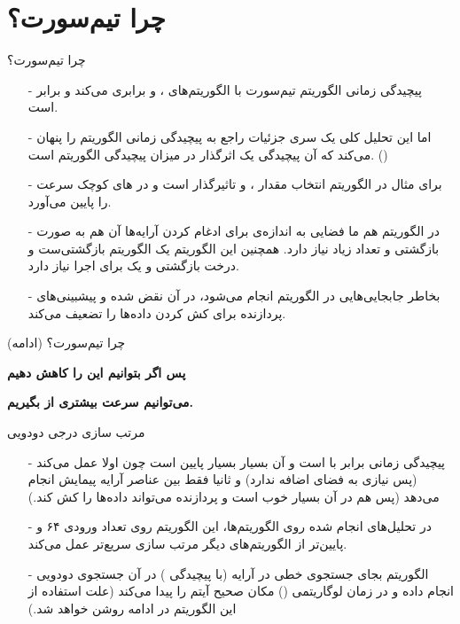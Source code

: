 \section{چرا تیم‌سورت؟}
\begin{frame}{چرا تیم‌سورت؟}
\begin{itemize}\itemr
\item[-]
پیچیدگی زمانی الگوریتم تیم‌سورت با الگوریتم‌های 
،
 و
برابری می‌کند و برابر 
است.

\item[-]
اما این تحلیل کلی یک سری جزئیات راجع به پیچیدگی زمانی الگوریتم را پنهان می‌کند که آن پیچیدگی یک 
اثرگذار در میزان پیچیدگی الگوریتم است. ()

\item[-]
برای مثال در الگوریتم  انتخاب مقدار 
،
 و
تاثیرگذار است و در های کوچک سرعت را پایین می‌آورد.

\item[-]
در الگوریتم 
هم ما فضایی به اندازه‌ی  برای ادغام کردن آرایه‌ها آن هم به صورت بازگشتی و تعداد زیاد نیاز دارد. همچنین این الگوریتم یک الگوریتم بازگشتی‌ست و درخت بازگشتی و یک  برای اجرا نیاز دارد.

\item[-]
بخاطر جابجایی‌هایی در الگوریتم  انجام می‌شود، 
در آن نقض شده و پیشبینی‌های پردازنده‌ برای کش کردن داده‌ها را تضعیف می‌کند.
\end{itemize}
\end{frame}

\begin{frame}{چرا تیم‌سورت؟ (ادامه)}
\begin{center}
{\Large \textbf{پس اگر بتوانیم این  را کاهش دهیم}}

{\Large \textbf{می‌توانیم سرعت بیشتری از  بگیریم.}}
\end{center}
\end{frame}

\begin{frame}{مرتب سازی درجی دودویی}
\begin{itemize}\itemr
\item[-]
پیچیدگی زمانی  برابر با 
است و 
آن بسیار بسیار پایین است چون اولا  عمل می‌کند (پس نیازی به فضای اضافه ندارد) و ثانیا فقط بین عناصر آرایه پیمایش انجام می‌دهد (پس  هم در آن بسیار خوب است و پردازنده می‌تواند داده‌ها را کش کند.)

\item[-]
در تحلیل‌های انجام شده روی الگوریتم‌ها، این الگوریتم روی تعداد ورودی ۶۴ و پایین‌تر از الگوریتم‌های دیگر مرتب سازی سریع‌تر عمل می‌‌کند.

\item[-]
الگوریتم 
بجای جستجوی خطی در آرایه (با پیچیدگی ) در آن جستجوی دودویی انجام داده و در زمان لوگاریتمی () مکان صحیح آیتم را پیدا می‌‌کند (علت استفاده از این الگوریتم در ادامه روشن خواهد شد.)
\end{itemize}
\end{frame}

